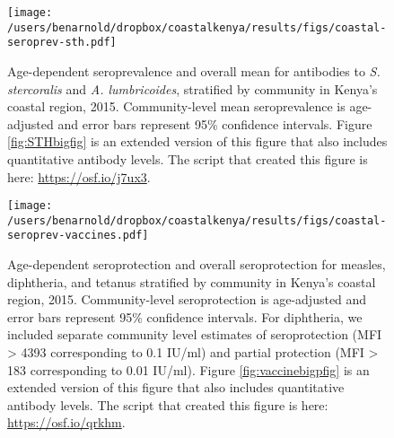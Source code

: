 \documentclass[11pt]{article}
\begin{document}
\begin{figure}[htbp]
\begin{center}
\texttt{[image: /users/benarnold/dropbox/coastalkenya/results/figs/coastal-seroprev-sth.pdf]} 
\begin{minipage}{0.9\textwidth}
\caption{Age-dependent seroprevalence and overall mean for antibodies to \emph{S. stercoralis} and \emph{A. lumbricoides}, stratified by community in Kenya's coastal region, 2015. Community-level mean seroprevalence is age-adjusted and error bars represent 95\% confidence intervals. Figure \ref{fig:STHbigfig} is an extended version of this figure that also includes quantitative antibody levels. The script that created this figure is here: \url{https://osf.io/j7ux3}.}
\label{fig:STHseroprev}
\end{minipage}
\end{center}
\end{figure}



\begin{figure}[htbp]
\begin{center}
\texttt{[image: /users/benarnold/dropbox/coastalkenya/results/figs/coastal-seroprev-vaccines.pdf]} 
\begin{minipage}{1\textwidth}
\caption{Age-dependent seroprotection and overall seroprotection for measles, diphtheria, and tetanus stratified by community in Kenya's coastal region, 2015. Community-level seroprotection is age-adjusted and error bars represent 95\% confidence intervals. For diphtheria, we included separate community level estimates of seroprotection (MFI > 4393 corresponding to 0.1 IU/ml) and partial protection (MFI > 183 corresponding to 0.01 IU/ml).  Figure \ref{fig:vaccinebigpfig} is an extended version of this figure that also includes quantitative antibody levels. The script that created this figure is here: \url{https://osf.io/qrkhm}.}
\label{fig:vaccineseroprev}
\end{minipage}
\end{center}
\end{figure}
\end{document}
